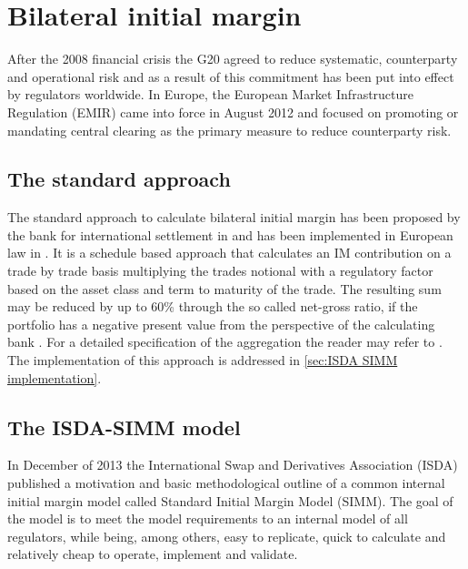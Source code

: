 \documentclass[../Thesis_AHoecherl.tex]{subfiles}
\begin{document}
    \section{Bilateral initial margin}\label{Bilateral initial margin}
    
    After the 2008 financial crisis the G20 agreed to reduce systematic, counterparty and operational risk and as a result of this commitment has been put into effect by regulators worldwide. In Europe, the European Market Infrastructure Regulation (EMIR) came into force in August 2012 and focused on promoting or mandating central clearing as the primary measure to reduce counterparty risk.

    \subsection{The standard approach}\label{The standard approach}


    The standard approach to calculate bilateral initial margin has been proposed by the bank for international settlement in  and has been implemented in European law in . It is a schedule based approach that calculates an \gls{IM} contribution on a trade by trade basis multiplying the trades notional with a regulatory factor based on the asset class and term to maturity of the trade.
    The resulting sum may be reduced by up to 60\% through the so called net-gross ratio, if the portfolio has a negative present value from the perspective of the calculating bank .
    For a detailed specification of the aggregation the reader may refer to . The implementation of this approach is addressed in \ref{sec:ISDA SIMM implementation}.
    
    \subsection{The ISDA-SIMM model}\label{sec:The ISDA-SIMM model}
    In December of 2013 the International Swap and Derivatives Association (ISDA) published a motivation and basic methodological outline of a common internal initial margin model called Standard Initial Margin Model (SIMM\texttrademark)\cite{ISDADec2013}. The goal of the model is to meet the model requirements to an internal model of all regulators, while being, among others, easy to replicate, quick to calculate and relatively cheap to operate, implement and validate.
\end{document}
